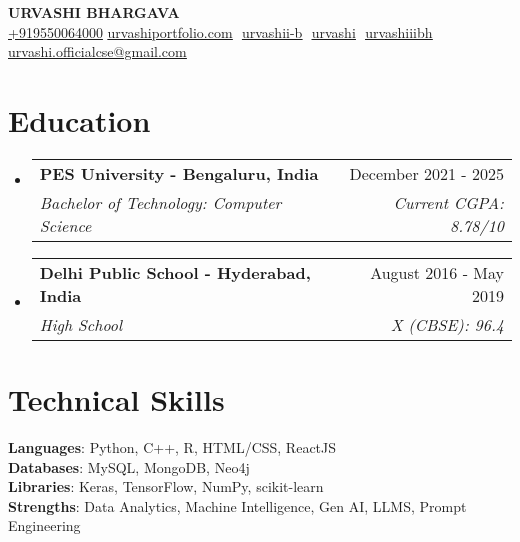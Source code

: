 \documentclass[letterpaper,11pt]{article}
\makeatletter
\newcommand{\resumeSubheading}[4]{
  \vspace{-2pt}\item
    \begin{tabular*}{0.97\textwidth}[t]{l@{\extracolsep{\fill}}r}
      \textbf{#1} & #2 \\
      \textit{\small#3} & \textit{\small #4} \\
    \end{tabular*}\vspace{-7pt}
}
\newcommand{\resumeSubHeadingListStart}{\begin{itemize}[leftmargin=0.15in, label={}]}
\newcommand{\resumeSubHeadingListEnd}{\end{itemize}}
\makeatother
\begin{document}
\begin{flushright}
  \vspace{-4pt}
  \color{gray}
  \item
\end{flushright}

\vspace{-7pt}

\begin{center}
    \textbf{\Huge \scshape URVASHI BHARGAVA} \\ \vspace{8pt}
    \small 
    \href{tel:+919550064000}{+919550064000}
    \href{https://urvashiportfolio.com/}
    {\underline{urvashiportfolio.com}} $  $
    \href{https://github.com/urvashii-b}
    {\underline{urvashii-b}} $  $
    \href{https://www.linkedin.com/in/urvashi-bhargava-b66100262/}{\underline{urvashi}} $  $
    \href{https://leetcode.com/urvashiiibh/}{\underline{urvashiiibh}} $  $
    \href{mailto:urvashi.officialcse@gmail.com}
    {\underline{urvashi.officialcse@gmail.com}} $  $
\end{center}

    
\section{Education}
  \resumeSubHeadingListStart  
    \resumeSubheading
      {PES University - Bengaluru, India}{December 2021 - 2025}
      {Bachelor of Technology: Computer Science}{Current CGPA: 8.78/10}
    \resumeSubheading
      {Delhi Public School - Hyderabad, India}{August 2016 - May 2019}
      {High School}{X (CBSE): 96.4}     
    \vspace{3pt}
  \resumeSubHeadingListEnd
    
\section{Technical Skills}
 \begin{itemize}[leftmargin=0.15in, label={}]
    \small{\item{
     \textbf{Languages}{: Python, C++, R, HTML/CSS, ReactJS} \\
     \textbf{Databases}{: MySQL, MongoDB, Neo4j} \\    
     \textbf{Libraries}{: Keras, TensorFlow, NumPy, scikit-learn}  \\
     \textbf{Strengths}{: Data Analytics, Machine Intelligence, Gen AI, LLMS, Prompt Engineering} \\
    }}
 \end{itemize}
\end{document}

